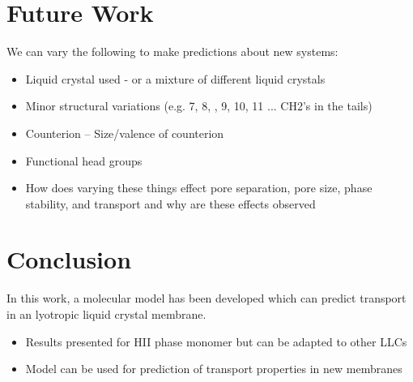 \documentclass{article}
\begin{document}
	\section{Future Work}
	We can vary the following to make predictions about new systems:
		\begin{itemize}
			\item Liquid crystal used - or a mixture of different liquid crystals
			\item Minor structural variations (e.g. 7, 8, , 9, 10, 11 ... CH2's in the tails)
			\item Counterion -- Size/valence of counterion
			\item Functional head groups
			\item How does varying these things effect pore separation, pore size, phase stability, and transport and why are these effects observed
		\end{itemize} 
	\section{Conclusion}
	
	In this work, a molecular model has been developed which can predict transport in an lyotropic liquid crystal membrane. 
	\begin{itemize}
		\item Results presented for HII phase monomer but can be adapted to other LLCs
		\item Model can be used for prediction of transport properties in new membranes
	\end{itemize}
	
\end{document}
